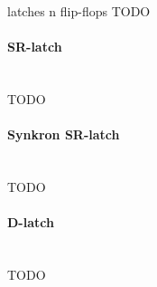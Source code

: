 latches n flip-flops TODO



\paragraph{SR-latch} \mbox{} \\
TODO



\paragraph{Synkron SR-latch} \mbox{} \\
TODO



\paragraph{D-latch} \mbox{} \\
TODO
